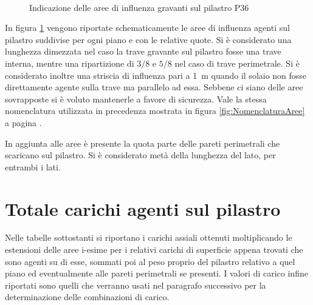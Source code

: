 \begin{figure}[htbp]
 \\
\caption{Indicazione delle aree di influenza gravanti sul pilastro P36}
\label{fig:AreeInfluenzaP36}
\end{figure}
In figura \ref{fig:AreeInfluenzaP36} vengono riportate schematicamente le aree di influenza agenti sul pilastro suddivise per ogni piano e con le relative quote. 
Si è considerato una lunghezza dimezzata nel caso la trave gravante sul pilastro fosse una trave interna, mentre una ripartizione di $3/8$ e $5/8$ nel caso di trave perimetrale. 
Si è considerato inoltre una striscia di influenza pari a \SI{1}{\meter} quando il solaio non fosse direttamente agente sulla trave ma parallelo ad essa. 
Sebbene ci siano delle aree sovrapposte si è voluto mantenerle a favore di sicurezza.
Vale la stessa nomenclatura utilizzata in precedenza mostrata in figura \ref{fig:NomenclaturaAree} a pagina \pageref{fig:NomenclaturaAree}.

In aggiunta alle aree è presente la quota parte delle pareti perimetrali che scaricano sul pilastro. 
Si è considerato metà della lunghezza del lato, per entrambi i lati.
\section{Totale carichi agenti sul pilastro}
Nelle tabelle sottostanti si riportano i carichi assiali ottenuti moltiplicando le estensioni delle aree i-esime per i relativi carichi di superficie appena trovati che sono agenti su di esse, sommati poi al peso proprio del pilastro relativo a quel piano ed eventualmente alle pareti perimetrali se presenti.
I valori di carico infine riportati sono quelli che verranno usati nel paragrafo successivo per la determinazione delle combinazioni di carico.
